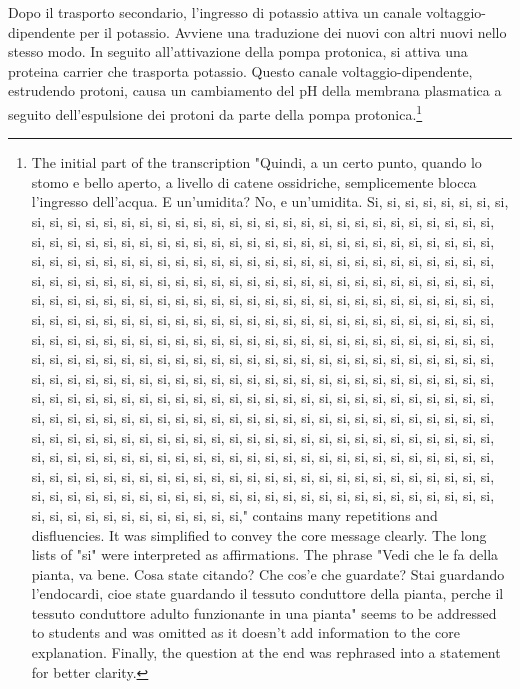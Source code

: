 \documentclass[11pt, a4paper]{article}
\begin{document}
\begin{spacing}{1.15}
Dopo il trasporto secondario, l'ingresso di potassio attiva un canale voltaggio-dipendente per il potassio. Avviene una traduzione dei nuovi con altri nuovi nello stesso modo. In seguito all'attivazione della pompa protonica, si attiva una proteina carrier che trasporta potassio. Questo canale voltaggio-dipendente, estrudendo protoni, causa un cambiamento del pH della membrana plasmatica a seguito dell'espulsione dei protoni da parte della pompa protonica.\footnote{The initial part of the transcription "Quindi, a un certo punto, quando lo stomo e bello aperto, a livello di catene ossidriche, semplicemente blocca l'ingresso dell'acqua. E un'umidita? No, e un'umidita. Si, si, si, si, si, si, si, si, si, si, si, si, si, si, si, si, si, si, si, si, si, si, si, si, si, si, si, si, si, si, si, si, si, si, si, si, si, si, si, si, si, si, si, si, si, si, si, si, si, si, si, si, si, si, si, si, si, si, si, si, si, si, si, si, si, si, si, si, si, si, si, si, si, si, si, si, si, si, si, si, si, si, si, si, si, si, si, si, si, si, si, si, si, si, si, si, si, si, si, si, si, si, si, si, si, si, si, si, si, si, si, si, si, si, si, si, si, si, si, si, si, si, si, si, si, si, si, si, si, si, si, si, si, si, si, si, si, si, si, si, si, si, si, si, si, si, si, si, si, si, si, si, si, si, si, si, si, si, si, si, si, si, si, si, si, si, si, si, si, si, si, si, si, si, si, si, si, si, si, si, si, si, si, si, si, si, si, si, si, si, si, si, si, si, si, si, si, si, si, si, si, si, si, si, si, si, si, si, si, si, si, si, si, si, si, si, si, si, si, si, si, si, si, si, si, si, si, si, si, si, si, si, si, si, si, si, si, si, si, si, si, si, si, si, si, si, si, si, si, si, si, si, si, si, si, si, si, si, si, si, si, si, si, si, si, si, si, si, si, si, si, si, si, si, si, si, si, si, si, si, si, si, si, si, si, si, si, si, si, si, si, si, si, si, si, si, si, si, si, si, si, si, si, si, si, si, si, si, si, si, si, si, si, si, si, si, si, si, si, si, si, si, si, si, si, si, si, si, si, si, si, si, si, si, si, si, si, si, si, si, si, si, si, si, si, si, si, si, si, si, si, si, si, si, si, si, si, si, si, si, si, si, si, si, si, si, si, si, si, si, si, si, si, si, si, si, si, si, si, si, si, si, si, si, si, si, si, si, si, si, si, si, si, si, si, si, si, si, si, si, si, si, si, si, si, si, si, si, si, si," contains many repetitions and disfluencies. It was simplified to convey the core message clearly.  The long lists of "si" were interpreted as affirmations. The phrase "Vedi che le fa della pianta, va bene. Cosa state citando? Che cos'e che guardate? Stai guardando l'endocardi, cioe state guardando il tessuto conduttore della pianta, perche il tessuto conduttore adulto funzionante in una pianta" seems to be addressed to students and was omitted as it doesn't add information to the core explanation. Finally, the question at the end was rephrased into a statement for better clarity.}

\end{spacing}
\end{document}
